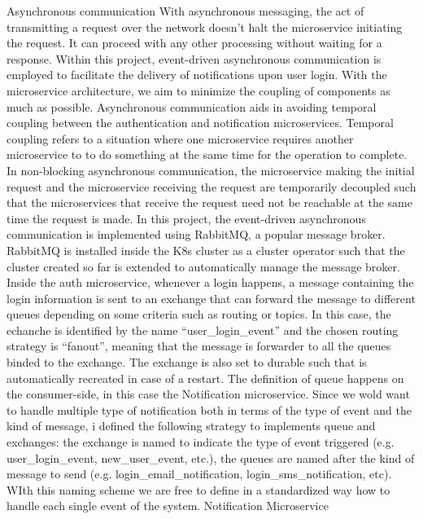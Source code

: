 \documentclass[sigplan,screen]{acmart}
\begin{document}
Asynchronous communication
With asynchronous messaging, the act of transmitting a request over the network doesn't halt the microservice initiating the request. It can proceed with any other processing without waiting for a response. Within this project, event-driven asynchronous communication is employed to facilitate the delivery of notifications upon user login.
With the microservice architecture, we aim to minimize the coupling of components as much as possible. Asynchronous communication aids in avoiding temporal coupling between the authentication and notification microservices. Temporal coupling refers to a situation where one microservice requires another microservice to  to do something at the same time for the operation to complete.
In non-blocking asynchronous communication, the microservice making the initial request and the microservice receiving the request are temporarily decoupled such that the microservices that receive the request need not be reachable at the same time the request is made.
In this project, the event-driven asynchronous communication is implemented using RabbitMQ, a popular message broker. RabbitMQ is installed inside the K8s cluster as a cluster operator such that the cluster created so far is extended to automatically manage the message broker. Inside the auth microservice, whenever a login happens, a message containing the login information is sent to an exchange that can forward the message to different queues depending on some criteria such as routing or topics. In this case, the echanche is identified by the name “user_login_event” and the chosen routing strategy is “fanout”, meaning that the message is forwarder to all the queues binded to the exchange. The exchange is also set to durable such that is automatically recreated in case of a restart. The definition of queue happens on the consumer-side, in this case the Notification microservice. Since we wold want to handle multiple type of notification both in terms of the type of event and the kind of message, i defined the following strategy to implements queue and exchanges: the exchange is named to indicate the type of event triggered (e.g. user_login_event, new_user_event, etc.), the queues are named after the kind of message to send (e.g. login_email_notification, login_sms_notification, etc). WIth this naming scheme we are free to define in a standardized way how to handle each single event of the system.
Notification Microservice
\end{document}
